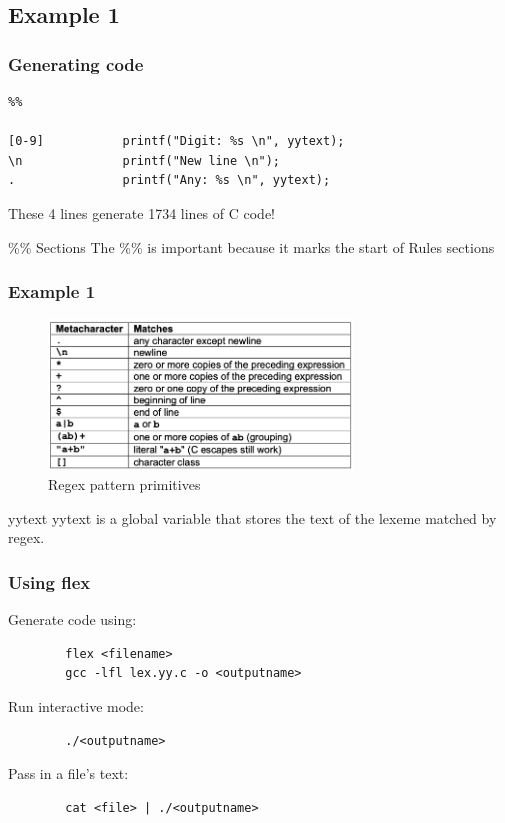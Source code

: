 \documentclass{beamer}
\begin{document}
\subsection{Example 1}

\begin{frame}[fragile]
    \frametitle{Generating code}
    
    \begin{verbatim}
%%

[0-9]           printf("Digit: %s \n", yytext);
\n              printf("New line \n");
.               printf("Any: %s \n", yytext);
    \end{verbatim}
    
    These 4 lines generate 1734 lines of C code!
    
    \begin{block}{\%\% Sections}
        The \%\% is important because it marks the start of Rules sections
    \end{block}
\end{frame}

\begin{frame}
    \frametitle{Example 1}
    
    \begin{figure}
        \centering
        \includegraphics[height=4cm]{imgs/regex.png}
        \caption{Regex pattern primitives}
        \label{fig:regex}
    \end{figure}
    
    \begin{alertblock}{yytext}
        yytext is a global variable that stores the text of the lexeme matched by regex.
    \end{alertblock}
\end{frame}

\begin{frame}[fragile]
    \frametitle{Using flex}
    
    Generate code using:
    \begin{verbatim}
        flex <filename>
        gcc -lfl lex.yy.c -o <outputname>
    \end{verbatim}
    
    Run interactive mode:
    \begin{verbatim}
        ./<outputname>
    \end{verbatim}
    
    Pass in a file's text:
    \begin{verbatim}
        cat <file> | ./<outputname>
    \end{verbatim}
\end{frame}
\end{document}
